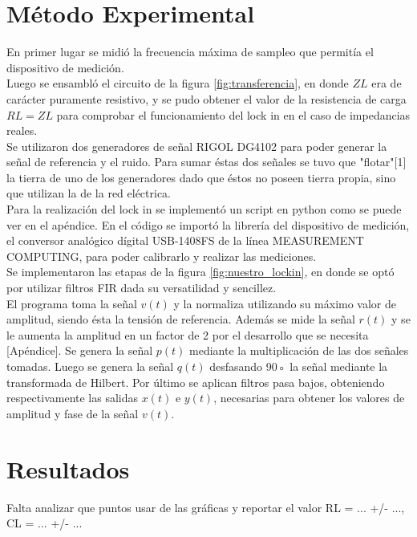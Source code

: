 \documentclass[11pt,a4paper]{extarticle}
\begin{document}
\begin{multicols}{2}
\section{Método Experimental}
En primer lugar se midió la frecuencia máxima de 
sampleo que permitía el dispositivo de medición.\\

Luego se ensambló el circuito de la figura 
\ref{fig:transferencia}, en donde $ZL$ era de carácter
 puramente resistivo, y se pudo obtener 
el valor de la resistencia de carga $RL = ZL$ para 
comprobar el funcionamiento del lock in en el caso 
de impedancias reales.\\ 

Se utilizaron dos generadores de señal RIGOL DG4102 
para poder generar la señal de referencia y el ruido.
Para sumar éstas dos señales se tuvo que "flotar"[1] la 
tierra de uno de los generadores dado que éstos no poseen 
tierra propia, sino que utilizan la de la red eléctrica.\\

Para la realización del lock in se implementó un 
script en python como se puede ver en el apéndice.
En el código se importó la librería del dispositivo 
de medición, el 
conversor analógico dígital USB-1408FS de la línea 
MEASUREMENT COMPUTING, para poder 
calibrarlo y realizar las mediciones.\\

Se implementaron 
las etapas de la figura \ref{fig:nuestro_lockin},
 en donde se optó por utilizar filtros FIR dada 
 su versatilidad y sencillez.\\

El programa toma la señal $v(t)$
y la normaliza utilizando su máximo valor de amplitud,
 siendo ésta la tensión de referencia. Además se mide 
 la señal $r(t)$ y se le aumenta la amplitud en un factor
 de 2 por el desarrollo que se necesita [Apéndice].
Se genera la señal $p(t)$ mediante la multiplicación de 
las dos señales tomadas.
Luego se genera la señal $q(t)$ desfasando 90◦
la señal 
mediante la transformada de Hilbert.
Por último se aplican filtros pasa bajos,
 obteniendo respectivamente las salidas $x(t)$ e $y(t)$,
  necesarias para obtener los
valores de amplitud y fase de la señal $v(t)$.


\section{Resultados}

Falta analizar que puntos usar de las gráficas y reportar
el valor RL = ... +/- ..., CL = ... +/- ...\\


\end{multicols}
\end{document}
